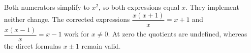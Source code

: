 Both numerators simplify to $x^2$, so both expressions equal $\boxed x$. They implement neither change. The corrected expressions $\dfrac{x(x+1)}{x}=x+1$ and $\dfrac{x(x-1)}{x}=x-1$ work for $x\ne0$. At zero the quotients are undefined, whereas the direct formulas $x\pm1$ remain valid.
